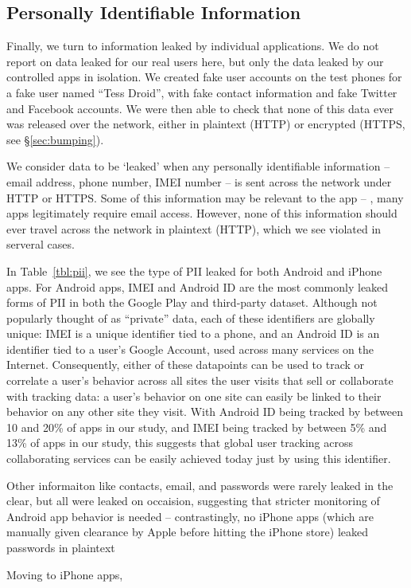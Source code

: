 \subsection{Personally Identifiable Information}
 
  Finally, we turn to information leaked by individual applications. We do not report on data leaked for our real users here, but only the data leaked by our controlled apps in isolation.
  We created fake user accounts on the test phones for a fake user named ``Tess Droid'', with fake contact information and fake Twitter and Facebook accounts. 
  We were then able to check that none of this data ever was released over the network, either in plaintext (HTTP) or encrypted (HTTPS, see \S\ref{sec:bumping}).
  
  We consider data to be `leaked' when any personally identifiable information -- email address, phone number, IMEI number -- is sent across the network under HTTP or HTTPS.
  Some of this information may be relevant to the app -- \eg{}, many apps legitimately require email access. 
  However, none of this information should ever travel across the network in plaintext (HTTP), which we see violated in serveral cases.

  In Table~\ref{tbl:pii}, we see the type of PII leaked for both Android and iPhone apps.
  For Android apps, IMEI and Android ID are the most commonly leaked forms of PII in both the Google Play and third-party dataset.
  Although not popularly thought of as ``private'' data, each of these identifiers are globally unique: IMEI is a unique identifier tied to a phone, and an Android ID is an identifier tied to a user's Google Account, used across many services on the Internet. 
  Consequently, either of these datapoints can be used to track or correlate a user's behavior across all sites the user visits that sell or collaborate with tracking data: a user's behavior on one site can easily be linked to their behavior on any other site they visit.
  With Android ID being tracked by between 10 and 20\% of apps in our study, and IMEI being tracked by between 5\% and 13\% of apps in our study, this suggests that global user tracking across collaborating services can be easily achieved today just by using this identifier.

  Other informaiton like contacts, email, and passwords were rarely leaked in the clear, but all were leaked on occaision, suggesting that stricter monitoring of Android app behavior is needed -- contrastingly, no iPhone apps (which are manually given clearance by Apple before hitting the iPhone store) leaked passwords in plaintext~

  Moving to iPhone apps, 





